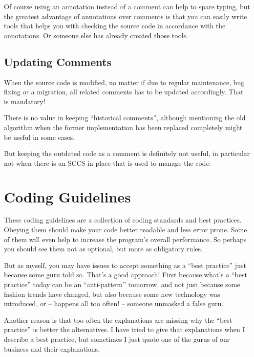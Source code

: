 \documentclass[11pt,a4paper, titlepage, parskip=half, headsepline, footsepline, cleardoublepage=current, headheight=1cm]{scrbook}
\begin{document}
Of course using an annotation instead of a comment can help to spare typing, but the greatest advantage of annotations over comments is that you can easily write tools that helps you with checking the source code in accordance with the annotations. Or someone else has already created those tools.


\section{Updating Comments}
When the source code is modified, no matter if due to regular maintenance, bug fixing or a migration, all related comments has to be updated accordingly. That is mandatory!

There is no value in keeping “historical comments”, although mentioning the old algorithm when the former implementation has been replaced completely might be useful in some cases.

But keeping the outdated code as a comment is definitely not useful, in particular not when there is an SCCS in place that is used to manage the code.


\chapter{Coding Guidelines}\label{sec:CodingGuidelines}
These coding guidelines are a collection of coding standards and best practices. Obeying them should make your code better readable and less error prone. Some of them will even help to increase the program's overall performance. So perhaps you should see them not as optional, but more as obligatory rules.

But as myself, you may have issues to accept something as a “best practice” just because some guru told so. That's a good approach! First because what's a “best practice” today can be an “anti-pattern” tomorrow, and not just because some fashion trends have changed, but also because some new technology was introduced, or – happens all too often! – someone unmasked a false guru.

Another reason is that too often the explanations are missing why the “best practice” is better the alternatives. I have tried to give that explanations when I describe a best practice, but sometimes I just quote one of the gurus of our business and their explanations.
\end{document}
